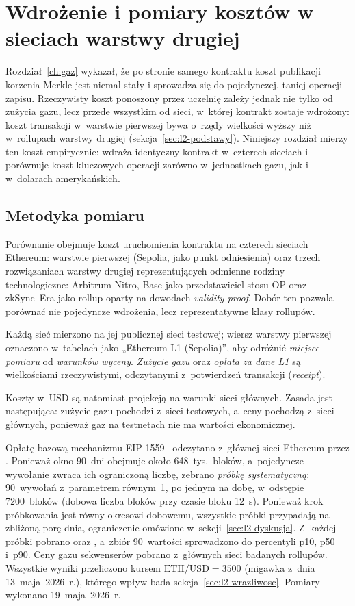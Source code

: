 \chapter{Wdrożenie i pomiary kosztów w sieciach warstwy drugiej}
\label{ch:l2}

Rozdział~\ref{ch:gaz} wykazał, że po stronie samego kontraktu koszt publikacji
korzenia Merkle jest niemal stały i sprowadza się do pojedynczej, taniej operacji
zapisu. Rzeczywisty koszt ponoszony przez uczelnię zależy jednak nie tylko od
zużycia gazu, lecz przede wszystkim od sieci, w~której kontrakt zostaje wdrożony:
koszt transakcji w~warstwie pierwszej bywa o~rzędy wielkości wyższy niż
w~rollupach warstwy drugiej (sekcja~\ref{sec:l2-podstawy}). Niniejszy rozdział
mierzy ten koszt empirycznie: wdraża identyczny kontrakt 
w~czterech sieciach i porównuje koszt kluczowych operacji zarówno w~jednostkach
gazu, jak i w~dolarach amerykańskich.

\section{Metodyka pomiaru}
\label{sec:l2-metodyka}

Porównanie obejmuje koszt uruchomienia kontraktu  na czterech
sieciach Ethereum: warstwie pierwszej (Sepolia, jako punkt odniesienia) oraz trzech
rozwiązaniach warstwy drugiej reprezentujących odmienne rodziny technologiczne:
Arbitrum Nitro, Base jako przedstawiciel stosu OP oraz zkSync~Era jako rollup
oparty na dowodach \emph{validity proof}. Dobór ten pozwala
porównać nie pojedyncze wdrożenia, lecz reprezentatywne klasy rollupów.

Każdą sieć mierzono na jej publicznej sieci testowej; wiersz warstwy pierwszej
oznaczono w~tabelach jako „Ethereum L1 (Sepolia)'', aby odróżnić \emph{miejsce
pomiaru} od \emph{warunków wyceny}. \emph{Zużycie gazu} oraz \emph{opłata za dane
L1} są wielkościami rzeczywistymi, odczytanymi z~potwierdzeń transakcji
(\emph{receipt}).

Koszty w~USD są natomiast projekcją na warunki sieci głównych. Zasada jest
następująca: zużycie gazu pochodzi z~sieci testowych, a~ceny pochodzą z~sieci głównych,
ponieważ gaz na testnetach nie ma wartości ekonomicznej.

Opłatę bazową mechanizmu EIP-1559~\cite{eip1559} odczytano z~głównej sieci
Ethereum przez . Ponieważ okno 90~dni obejmuje około
648~tys.\ bloków, a~pojedyncze wywołanie zwraca ich ograniczoną liczbę, zebrano
\emph{próbkę systematyczną}: 90~wywołań z~parametrem  równym~1,
po jednym na dobę, w~odstępie 7200~bloków (dobowa liczba bloków przy czasie
bloku 12~s). Ponieważ krok próbkowania jest równy okresowi dobowemu, wszystkie
próbki przypadają na zbliżoną porę dnia, ograniczenie omówione
w~sekcji~\ref{sec:l2-dyskusja}. Z~każdej próbki pobrano  oraz
, a~zbiór 90~wartości sprowadzono do percentyli p10, p50
i~p90. Ceny gazu sekwenserów pobrano z~głównych sieci badanych rollupów.
Wszystkie wyniki przeliczono kursem $\text{ETH}/\text{USD}=3500$ (migawka z~dnia
13~maja~2026~r.), którego wpływ bada sekcja~\ref{sec:l2-wrazliwosc}. Pomiary
wykonano 19~maja~2026~r.

